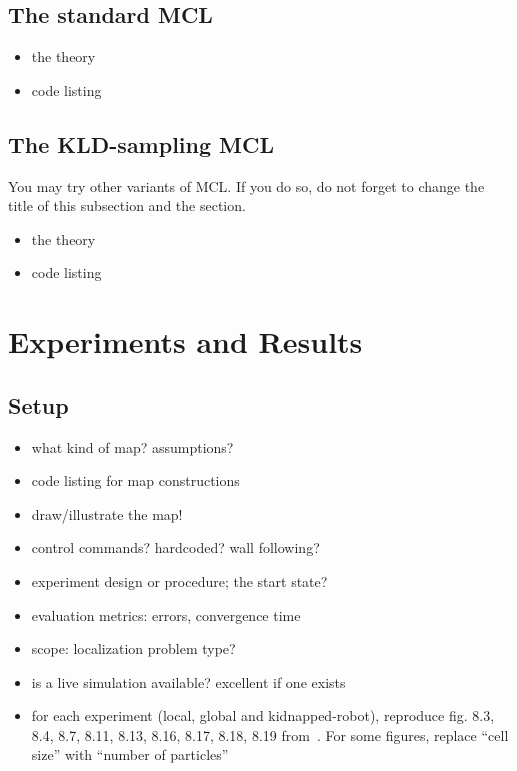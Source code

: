 \documentclass[letterpaper, 10 pt, conference]{ieeeconf}  %
\begin{document}
\subsection{The standard MCL}
\begin{itemize}
\item the theory
\item code listing
\end{itemize}

\subsection{The KLD-sampling MCL}
You may try other variants of MCL.
If you do so, do not forget to change the title of this subsection and the section.
\begin{itemize}
\item the theory
\item code listing
\end{itemize}

\section{Experiments and Results}

\subsection{Setup}
\begin{itemize}
    \item what kind of map? assumptions?
    \item code listing for map constructions
    \item draw/illustrate the map!
    \item control commands? hardcoded? wall following?
    \item experiment design or procedure; the start state?
    \item evaluation metrics: errors, convergence time
    \item scope: localization problem type?
    \item is a live simulation available? excellent if one exists
    \item for each experiment (local, global and kidnapped-robot), reproduce fig. 8.3, 8.4, 8.7, 8.11, 8.13, 8.16, 8.17, 8.18, 8.19 from~\cite{Thrun:2005:PR}. For some figures, replace ``cell size'' with ``number of particles''
\end{itemize}
\end{document}

